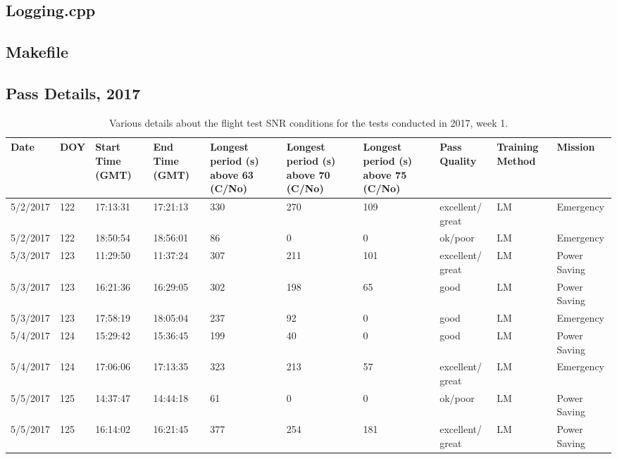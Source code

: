 \section{Logging.cpp} \label{app:CppCode:loggingc}

\clearpage
\section{Makefile} \label{app:CppCode:make}

\clearpage

\begin{landscape}
\chapter{Pass Details, 2017} \label{app:pass_details_2017}
\begin{table}[ht]
\centering
\caption{Various details about the flight test SNR conditions for the tests conducted in 2017, week 1.}
\begin{tabular}{ | m{0.8in} | m{0.5in}| m{0.8in} |  m{0.8in} | m{0.8in}| m{0.8in} | m{0.8in} | m{0.8in}| m{0.8in} | m{0.82in} |}
\hline
Date & DOY& Start Time (GMT) & End Time (GMT) & Longest period (s) above 63 (C/No) & Longest period (s) above 70 (C/No) & Longest period (s) above 75 (C/No) & Pass Quality & Training Method & Mission\\
\hline
\hline
5/2/2017&122&17:13:31&17:21:13&330&270&109&excellent/ great&LM&Emergency\\ \hline
5/2/2017&122&18:50:54&18:56:01&86&0&0&ok/poor&LM&Emergency\\ \hline
5/3/2017&123&11:29:50&11:37:24&307&211&101&excellent/ great&LM&Power Saving\\ \hline
5/3/2017&123&16:21:36&16:29:05&302&198&65&good&LM&Power Saving\\ \hline
5/3/2017&123&17:58:19&18:05:04&237&92&0&good&LM&Emergency\\ \hline
5/4/2017&124&15:29:42&15:36:45&199&40&0&good&LM&Power Saving\\ \hline
5/4/2017&124&17:06:06&17:13:35&323&213&57&excellent/ great&LM&Emergency\\ \hline
5/5/2017&125&14:37:47&14:44:18&61&0&0&ok/poor&LM&Power Saving\\ \hline
5/5/2017&125&16:14:02&16:21:45&377&254&181&excellent/ great&LM&Power Saving\\ \hline
\end{tabular}
\end{table}
\begin{table}[ht]


\end{table}
\end{landscape}
